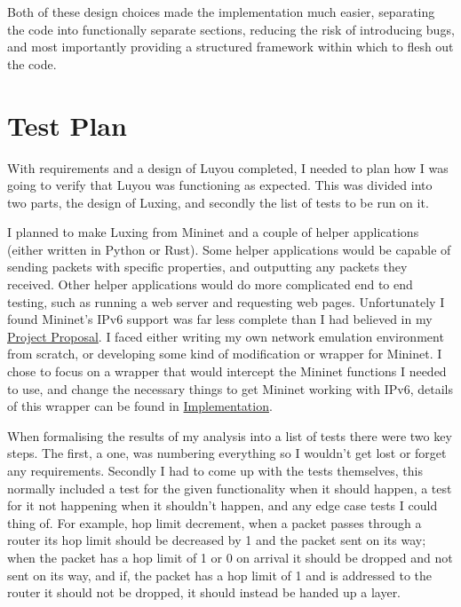 \documentclass[12pt,a4paper,twoside,openright]{report}
\begin{document}
\bigskip

Both of these design choices made the implementation much easier, separating the code into functionally separate sections, reducing the risk of introducing bugs, and most importantly providing a structured framework within which to flesh out the code.

\section{Test Plan}
\label{sec:test_plan}

With requirements and a design of Luyou completed, I needed to plan how I was going to verify that Luyou was functioning as expected.  This was divided into two parts, the design of Luxing, and secondly the list of tests to be run on it.

\bigskip

I planned to make Luxing from Mininet and a couple of helper applications (either written in Python or Rust).  Some helper applications would be capable of sending packets with specific properties, and outputting any packets they received. Other helper applications would do more complicated end to end testing, such as running a web server and requesting web pages.  Unfortunately I found Mininet's IPv6 support was far less complete than I had believed in my \hyperref[project_proposal]{Project Proposal}.  I faced either writing my own network emulation environment from scratch, or developing some kind of modification or wrapper for Mininet.  I chose to focus on a wrapper that would intercept the Mininet functions I needed to use, and change the necessary things to get Mininet working with IPv6, details of this wrapper can be found in \hyperref[chap::implementation]{Implementation}.

\bigskip

When formalising the results of my analysis into a list of tests there were two key steps. The first, a one, was numbering everything so I wouldn't get lost or forget any requirements.  Secondly I had to come up with the tests themselves, this normally included a test for the given functionality when it should happen, a test for it not happening when it shouldn't happen, and any edge case tests I could thing of.  For example, hop limit decrement, when a packet passes through a router its hop limit should be decreased by 1 and the packet sent on its way; when the packet has a hop limit of 1 or 0 on arrival it should be dropped and not sent on its way, and if, the packet has a hop limit of 1 and is addressed to the router it should not be dropped, it should instead be handed up a layer. 
\end{document}
